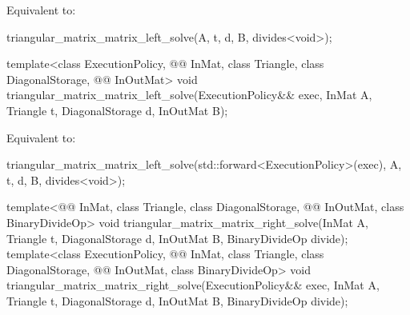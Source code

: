 \begin{itemdescr}
\pnum
\effects
Equivalent to:
\begin{codeblock}
triangular_matrix_matrix_left_solve(A, t, d, B, divides<void>{});
\end{codeblock}
\end{itemdescr}

%
\begin{itemdecl}
  template<class ExecutionPolicy,
           @@ InMat, class Triangle, class DiagonalStorage, @@ InOutMat>
    void triangular_matrix_matrix_left_solve(ExecutionPolicy&& exec,
                                             InMat A, Triangle t, DiagonalStorage d,
                                             InOutMat B);
\end{itemdecl}

\begin{itemdescr}
\pnum
\effects
Equivalent to:
\begin{codeblock}
triangular_matrix_matrix_left_solve(std::forward<ExecutionPolicy>(exec),
                                    A, t, d, B, divides<void>{});
\end{codeblock}
\end{itemdescr}

%
\begin{itemdecl}
template<@@ InMat, class Triangle, class DiagonalStorage,
         @@ InOutMat, class BinaryDivideOp>
  void triangular_matrix_matrix_right_solve(InMat A, Triangle t, DiagonalStorage d,
                                            InOutMat B, BinaryDivideOp divide);
template<class ExecutionPolicy, @@ InMat, class Triangle, class DiagonalStorage,
         @@ InOutMat, class BinaryDivideOp>
  void triangular_matrix_matrix_right_solve(ExecutionPolicy&& exec,
                                            InMat A, Triangle t, DiagonalStorage d,
                                            InOutMat B, BinaryDivideOp divide);
\end{itemdecl}

